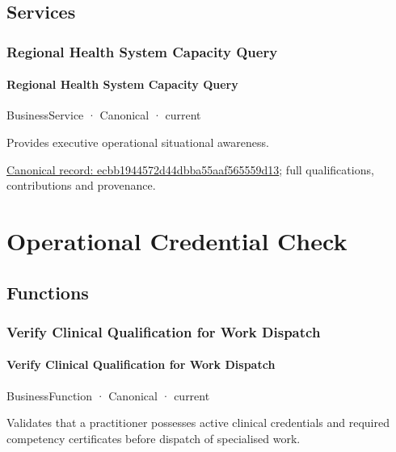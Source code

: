 \subsection{Services}

\subsubsection{Regional Health System Capacity Query}

\paragraph{Regional Health System Capacity Query}

\label{element:ecbb1944572d44dbba55aaf565559d13}
{\small BusinessService · Canonical · current}\par

Provides executive operational situational awareness.


{\footnotesize \href{../../../../continuum/business/business-service/ecbb1944572d44dbba55aaf565559d13.md}{Canonical record: ecbb1944572d44dbba55aaf565559d13}; full qualifications, contributions and provenance.}\par
\section{Operational Credential Check}

\subsection{Functions}

\subsubsection{Verify Clinical Qualification for Work Dispatch}

\paragraph{Verify Clinical Qualification for Work Dispatch}

\label{element:1dfebc3aa5f949e5a20faa504eadbee1}
{\small BusinessFunction · Canonical · current}\par

Validates that a practitioner possesses active clinical credentials and required competency certificates before dispatch of specialised work.



